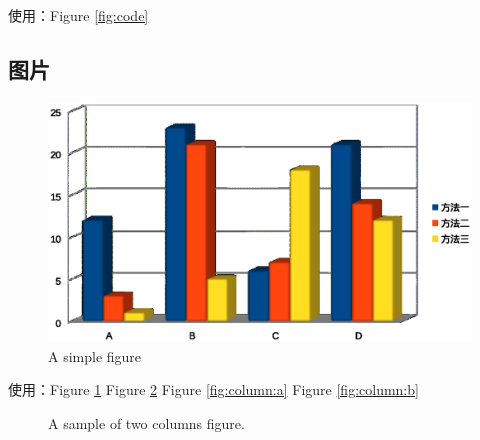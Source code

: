 \documentclass[twocolumn, twoside]{article}
\begin{document}
使用：Figure \ref{fig:code}

\subsection{图片}

\begin{figure}[!htb]
\centering
\includegraphics[width =\linewidth]{figure/simple.eps}
\caption{A simple figure}\label{fig:simple}
\end{figure}

使用：Figure \ref{fig:simple}    Figure \ref{fig:column}    Figure \ref{fig:column:a}    Figure \ref{fig:column:b}   


\begin{figure}[!htb]
\centering
  \caption{A sample of two columns figure.} 
  \label{fig:column} %

\end{figure}
\blindtext
\end{document}
